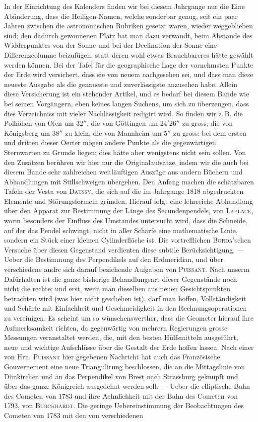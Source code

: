 In der Einrichtung des Kalenders finden wir bei diesem Jahrgange nur die Eine Abänderung, dass die Heiligen-Namen, welche sonderbar genug, seit ein paar Jahren zwischen die astronomischen Rubriken gesetzt waren, wieder weggeblieben sind; den dadurch gewonnenen Platz hat man dazu verwandt, beim Abstande des Widderpunktes von der Sonne und bei der Declination der Sonne eine Differenzcolumne beizufügen, statt deren wohl etwas Brauchbareres hätte gewählt werden können. Bei der Tafel für die geographische Lage der vornehmsten Punkte der Erde wird versichert, dass sie von neuem nachgesehen sei, und dass man diese neueste Ausgabe als die genaueste und zuverlässigste anzusehen habe. Allein diese Versicherung ist ein stehender Artikel, und es bedarf bei diesem Bande wie bei seinen Vorgängern, eben keines langen Suchens, um sich zu überzeugen, dass dies Verzeichniss mit vieler Nachlässigkeit redigirt wird. So finden wir z.\,B. die Polhöhen von Ofen um $32''$, die von Göttingen um $24' 26''$ zu gross, die von Königsberg um $38''$ zu klein, die von Mannheim um $5''$ zu gross: bei dem ersten und dritten dieser Oerter mögen andere Punkte als die gegenwärtigen Sternwarten zu Grunde liegen; dies hätte aber wenigstens nicht sein sollen. Von den Zusätzen berühren wir hier nur die Originalaufsätze, indem wir die auch bei diesem Bande sehr zahlreichen weitläuftigen Auszüge aus andern Büchern und Abhandlungen mit Stillschweigen übergehen. Den Anfang machen die schätzbaren Tafeln der Vesta von \textsc{Daussy}, die sich auf die im Jahrgange 1818 abgedruckten Elemente und Störungsformeln gründen. Hierauf folgt eine lehrreiche Abhandlung über den Apparat zur Bestimmung der Länge des Secundenpendels, von \textsc{Laplace}, worin besonders der Einfluss des Umstandes untersucht wird, dass die Schneide, auf der das Pendel schwingt, nicht in aller Schärfe eine mathematische Linie, sondern ein Stück einer kleinen Cylinderfläche ist. Die vortrefflichen \textsc{Borda}'schen Versuche über diesen Gegenstand verdienten diese subtile Berücksichtigung. --- Ueber die Bestimmung des Perpendikels auf den Erdmeridian, und über verschiedene andre sich darauf beziehende Aufgaben von \textsc{Puissant}. Nach unserm Dafürhalten ist die ganze bisherige Behandlungsart dieser Gegenstände noch nicht die rechte; und erst, wenn man dieselben aus neuen Gesichtspunkten betrachten wird (was hier nicht geschehen ist), darf man hoffen, Vollständigkeit und Schärfe mit Einfachheit und Geschmeidigkeit in den Rechnungsoperationen zu vereinigen. Es scheint um so wünschenswerther, dass die Geometer hierauf ihre Aufmerksamkeit richten, da gegenwärtig von mehrern Regierungen grosse Messungen veranstaltet werden, die, mit den besten Hülfsmitteln ausgeführt, neue und wichtige Aufschlüsse über die Gestalt der Erde hoffen lassen. Nach einer von Hrn. \textsc{Puissant} hier gegebenen Nachricht hat auch das Französische Gouvernement eine neue Triangulirung beschlossen, die an die Mittagslinie von Dünkirchen und an das Perpendikel von Brest nach Strassburg geknüpft und über das ganze Königreich ausgedehnt werden soll. --- Ueber die elliptische Bahn des Cometen von 1783 und ihre Aehnlichkeit mit der Bahn des Cometen von 1793, von \textsc{Burckhardt}. Die geringe Uebereinstimmung der Beobachtungen des Cometen von 1783 mit den von verschiedenen 